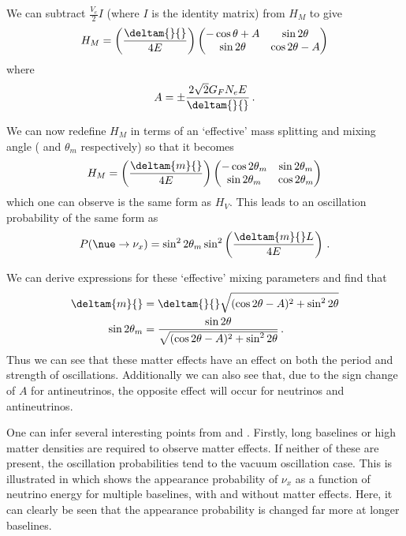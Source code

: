 We can subtract $\frac{V_{e}}{2} I$ (where $I$ is the identity matrix) from $H_{M}$ to give
\begin{equation}
  H_{M} = \left( \frac{\deltam{}{}}{4E} \right)
  \begin{pmatrix}
    -\cos\theta+A & \sin 2\theta \\
    \sin 2\theta & \cos 2\theta - A 
  \end{pmatrix}
\end{equation}
where
\begin{equation}
  A = \pm \frac{ 2\sqrt{2}G_{F}N_{e}E }{\deltam{}{}} \, .
\end{equation}

We can now redefine $H_{M}$ in terms of an `effective' mass splitting and mixing angle ( and $\theta_{m}$ respectively) so that it becomes
\begin{equation}
  H_{M} = \left( \frac{\deltam{m}{}}{4E} \right)
  \begin{pmatrix}
    -\cos 2\theta_{m} & \sin 2\theta_{m} \\
    \sin 2\theta_{m} & \cos 2\theta_{m}
  \end{pmatrix}
\end{equation}
which one can observe is the same form as $H_{V}$.
This leads to an oscillation probability of the same form as 
\begin{equation}
  P(\nue \rightarrow \nu_{x}) = \sin^{2} 2\theta_{m} \sin^{2} \left( \frac{\deltam{m}{} L}{4E} \right) \, .
\end{equation}

We can derive expressions for these `effective' mixing parameters and find that
\begin{align}
  \deltam{m}{} &= \deltam{}{} \sqrt{ (\cos 2\theta - A)^{2} + \sin^{2} 2\theta }  \label{eq:mswMass} \\
  \sin 2\theta_{m} &= \frac{\sin 2\theta}{\sqrt{ (\cos 2\theta - A)^{2} + \sin^{2} 2\theta }} \, . \label{eq:mswAngle}
\end{align}
Thus we can see that these matter effects have an effect on both the period and strength of oscillations.
Additionally we can also see that, due to the sign change of $A$ for antineutrinos, the opposite effect will occur for neutrinos and antineutrinos. 

One can infer several interesting points from  and .
Firstly, long baselines or high matter densities are required to observe matter effects.
If neither of these are present, the oscillation probabilities tend to the vacuum oscillation case.
This is illustrated in  which shows the appearance probability of $\nu_{x}$ as a function of neutrino energy for multiple baselines, with and without matter effects.
Here, it can clearly be seen that the appearance probability is changed far more at longer baselines.

